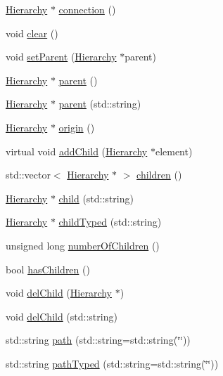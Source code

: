 \begin{DoxyCompactItemize}
\hyperlink{classHierarchy}{Hierarchy} $\ast$ \hyperlink{classElement_af57444353c1ddf9fa0109801e97debf7}{connection} ()
\item 
void \hyperlink{classHierarchy_af4d43b0765b402670eed2d62c73405af}{clear} ()
\item 
void \hyperlink{classHierarchy_a585ad1aeec16077a0e532ab8b4fc557b}{setParent} (\hyperlink{classHierarchy}{Hierarchy} $\ast$parent)
\item 
\hyperlink{classHierarchy}{Hierarchy} $\ast$ \hyperlink{classHierarchy_a1c7bec8257e717f9c1465e06ebf845fc}{parent} ()
\item 
\hyperlink{classHierarchy}{Hierarchy} $\ast$ \hyperlink{classHierarchy_ad550588733bf75ac5c0fcfd7c8fd11a6}{parent} (std::string)
\item 
\hyperlink{classHierarchy}{Hierarchy} $\ast$ \hyperlink{classHierarchy_aee461dc930ce3871636ff87f075b1b83}{origin} ()
\item 
virtual void \hyperlink{classHierarchy_ad677774ff38fcb257c04a3a10d471fac}{addChild} (\hyperlink{classHierarchy}{Hierarchy} $\ast$element)
\item 
std::vector$<$ \hyperlink{classHierarchy}{Hierarchy} $\ast$ $>$ \hyperlink{classHierarchy_aa9a76f69e98e052ee1a6e32cea006288}{children} ()
\item 
\hyperlink{classHierarchy}{Hierarchy} $\ast$ \hyperlink{classHierarchy_a1e207f973c694b538bf90107b4868817}{child} (std::string)
\item 
\hyperlink{classHierarchy}{Hierarchy} $\ast$ \hyperlink{classHierarchy_a0c15a5276a3b80b4354d6bd8a01e0708}{childTyped} (std::string)
\item 
unsigned long \hyperlink{classHierarchy_ab16e84de65fd84e14001a6cf941c8be4}{numberOfChildren} ()
\item 
bool \hyperlink{classHierarchy_a255174fe4d316d2a3f430dcb9dab29f1}{hasChildren} ()
\item 
void \hyperlink{classHierarchy_a2b2b359fac003233f65786a616766bde}{delChild} (\hyperlink{classHierarchy}{Hierarchy} $\ast$)
\item 
void \hyperlink{classHierarchy_a1928ac7615fe0b5e55cd707f70dc6781}{delChild} (std::string)
\item 
std::string \hyperlink{classHierarchy_aa7990fa7caf132d83e361ce033c6c65a}{path} (std::string=std::string(\char`\"{}\char`\"{}))
\item 
std::string \hyperlink{classHierarchy_a1efd56cd164d328d2002e53a10a19b8c}{pathTyped} (std::string=std::string(\char`\"{}\char`\"{}))
\item 

\end{DoxyCompactItemize}

